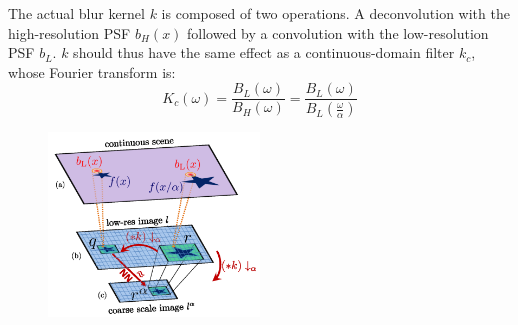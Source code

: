 \documentclass[11pt]{article}
\begin{document}
The actual blur kernel $k$ is composed of two operations. A deconvolution with the high-resolution PSF $b_H(x)$ followed by a convolution with the low-resolution PSF $b_L$. $k$ should thus have the same effect as a continuous-domain filter $k_c$, whose Fourier transform is:
\begin{equation}
	K_c(\omega) = \frac{B_L(\omega)}{B_H(\omega)} = \frac{B_L(\omega)}{B_L(\frac{\omega}{\alpha})}
	\label{eq:ContKFourierTrans}
\end{equation}


\begin{figure}[h]
	\centering
	\includegraphics[width=0.5\textwidth]{PatchRecurrenceVis.png}
	\caption{}
	\label{fig:PatchRecurrenceVisual}
\end{figure}
	\begin{appendices}
	\end{appendices}
	
\end{document}
